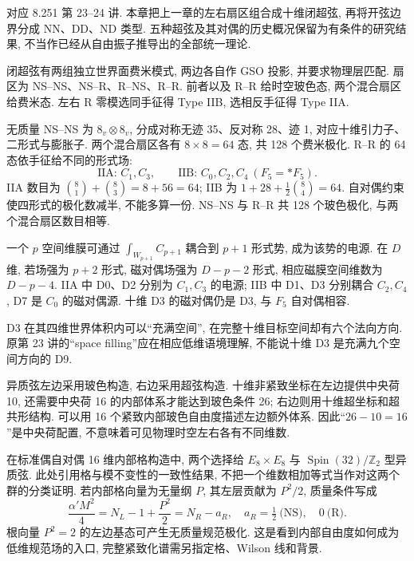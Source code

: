 \label{ch:basic-types-branes}
对应 8.251 第 23--24 讲. 本章把上一章的左右扇区组合成十维闭超弦, 再将开弦边界分成 NN、DD、ND 类型. 五种超弦及其对偶的历史概况保留为有条件的研究结果, 不当作已经从自由振子推导出的全部统一理论.

闭超弦有两组独立世界面费米模式, 两边各自作 GSO 投影, 并要求物理层匹配. 扇区为 NS--NS、NS--R、R--NS、R--R. 前者以及 R--R 给时空玻色态, 两个混合扇区给费米态. 左右 R 零模选同手征得 Type IIB, 选相反手征得 Type IIA.

无质量 NS--NS 为 $8_v\otimes8_v$, 分成对称无迹 35、反对称 28、迹 1, 对应十维引力子、二形式与膨胀子. 两个混合扇区各有 $8\times8=64$ 态, 共 128 个费米极化. R--R 的 64 态依手征给不同的形式场:
\[
 \text{IIA: }C_1,C_3,\qquad
 \text{IIB: }C_0,C_2,C_4\ (F_5=*F_5).
\]
IIA 数目为 $\binom81+\binom83=8+56=64$; IIB 为 $1+28+\frac12\binom84=64$. 自对偶约束使四形式的极化数减半, 不能多算一份. NS--NS 与 R--R 共 128 个玻色极化, 与两个混合扇区数目相等.

一个 $p$ 空间维膜可通过 $\int_{W_{p+1}}C_{p+1}$ 耦合到 $p+1$ 形式势, 成为该势的电源. 在 $D$ 维, 若场强为 $p+2$ 形式, 磁对偶场强为 $D-p-2$ 形式, 相应磁膜空间维数为 $D-p-4$. IIA 中 D0、D2 分别为 $C_1,C_3$ 的电源; IIB 中 D1、D3 分别耦合 $C_2,C_4$, D7 是 $C_0$ 的磁对偶源. 十维 D3 的磁对偶仍是 D3, 与 $F_5$ 自对偶相容.

D3 在其四维世界体积内可以“充满空间”, 在完整十维目标空间却有六个法向方向. 原第 23 讲的“space filling”应在相应低维语境理解, 不能说十维 D3 是充满九个空间方向的 D9.

异质弦左边采用玻色构造, 右边采用超弦构造. 十维非紧致坐标在左边提供中央荷 10, 还需要中央荷 16 的内部体系才能达到玻色条件 26; 右边则用十维超坐标和超共形结构. 可以用 16 个紧致内部玻色自由度描述左边额外体系. 因此“$26-10=16$”是中央荷配置, 不意味着可见物理时空左右各有不同维数.

在标准偶自对偶 16 维内部格构造中, 两个选择给 $E_8\times E_8$ 与 $\operatorname{Spin}(32)/\mathbb Z_2$ 型异质弦. 此处引用格与模不变性的一致性结果, 不把一个维数相加等式当作对这两个群的分类证明. 若内部格向量为无量纲 $P$, 其左层贡献为 $P^2/2$, 质量条件写成
\[
 \frac{\alpha'M^2}{4}=N_L-1+\frac{P^2}{2}
 =N_R-a_R,
 \quad a_R=\tfrac12\ \text{(NS)},\quad0\ \text{(R)}.
\]
根向量 $P^2=2$ 的左边基态可产生无质量规范极化. 这是看到内部自由度如何成为低维规范场的入口, 完整紧致化谱需另指定格、Wilson 线和背景.

